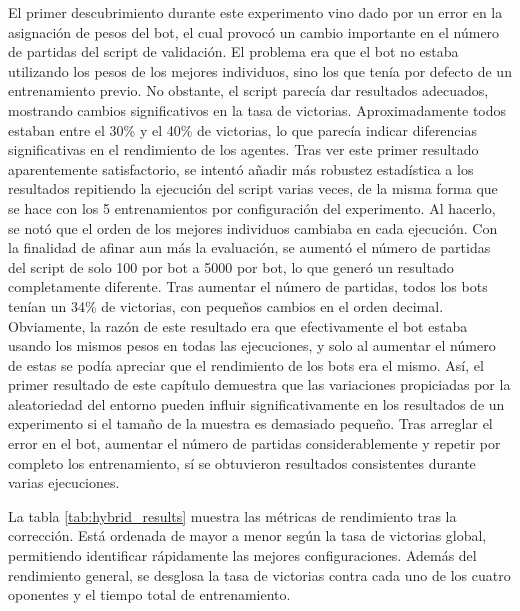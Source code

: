 El primer descubrimiento durante este experimento vino dado por un error en la asignación de pesos del bot, el cual provocó un cambio importante en el número de partidas del script de validación. El problema era que el bot no estaba utilizando los pesos de los mejores individuos, sino los que tenía por defecto de un entrenamiento previo. No obstante, el script parecía dar resultados adecuados, mostrando cambios significativos en la tasa de victorias. Aproximadamente todos estaban entre el 30\% y el 40\% de victorias, lo que parecía indicar diferencias significativas en el rendimiento de los agentes. Tras ver este primer resultado aparentemente satisfactorio, se intentó añadir más robustez estadística a los resultados repitiendo la ejecución del script varias veces, de la misma forma que se hace con los 5 entrenamientos por configuración del experimento. Al hacerlo, se notó que el orden de los mejores individuos cambiaba en cada ejecución. Con la finalidad de afinar aun más la evaluación, se aumentó el número de partidas del script de solo 100 por bot a 5000 por bot, lo que generó un resultado completamente diferente. Tras aumentar el número de partidas, todos los bots tenían un 34\% de victorias, con pequeños cambios en el orden decimal. Obviamente, la razón de este resultado era que efectivamente el bot estaba usando los mismos pesos en todas las ejecuciones, y solo al aumentar el número de estas se podía apreciar que el rendimiento de los bots era el mismo. Así, el primer resultado de este capítulo demuestra que las variaciones propiciadas por la aleatoriedad del entorno pueden influir significativamente en los resultados de un experimento si el tamaño de la muestra es demasiado pequeño. Tras arreglar el error en el bot, aumentar el número de partidas considerablemente y repetir por completo los entrenamiento, sí se obtuvieron resultados consistentes durante varias ejecuciones.

La tabla \ref{tab:hybrid_results} muestra las métricas de rendimiento tras la corrección. Está ordenada de mayor a menor según la tasa de victorias global, permitiendo identificar rápidamente las mejores configuraciones. Además del rendimiento general, se desglosa la tasa de victorias contra cada uno de los cuatro oponentes y el tiempo total de entrenamiento.

